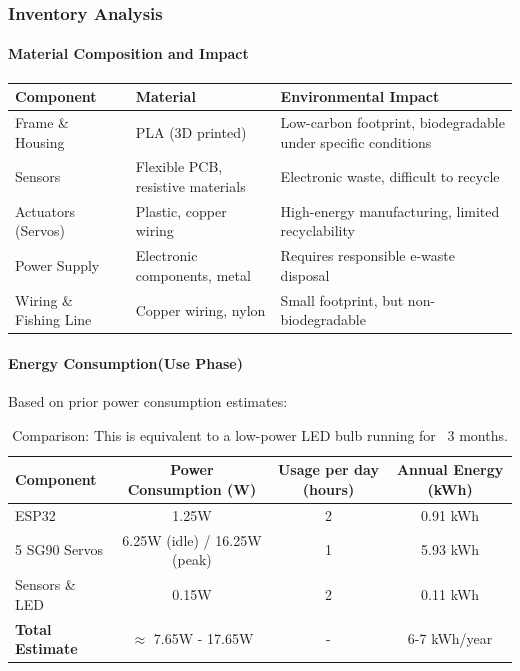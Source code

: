 \documentclass{article}
\begin{document}
\subsubsection{Inventory Analysis}
\paragraph{Material Composition and Impact}
\begin{table}[h]
    \hspace*{-3.5cm}
    \centering
    \begin{tabular}{|l|l|l|}
        \hline
        \textbf{Component} & \textbf{Material} & \textbf{Environmental Impact} \\ 
        \hline
        Frame \& Housing & PLA (3D printed) & Low-carbon footprint, biodegradable under specific conditions \\ 
        \hline
        Sensors & Flexible PCB, resistive materials & Electronic waste, difficult to recycle \\ 
        \hline
        Actuators (Servos) & Plastic, copper wiring & High-energy manufacturing, limited recyclability \\ 
        \hline
        Power Supply & Electronic components, metal & Requires responsible e-waste disposal \\ 
        \hline
        Wiring \& Fishing Line & Copper wiring, nylon & Small footprint, but non-biodegradable \\ 
        \hline
    \end{tabular}
    \label{tab:material_composition}
\end{table}
\paragraph{Energy Consumption(Use Phase)}
Based on prior power consumption estimates:
\begin{table}[h]
    \hspace*{-2.2cm}
    \centering
    \begin{tabular}{|l|c|c|c|}
        \hline
        \textbf{Component} & \textbf{Power Consumption (W)} & \textbf{Usage per day (hours)} & \textbf{Annual Energy (kWh)} \\ 
        \hline
        ESP32 & 1.25W & 2 & 0.91 kWh \\ 
        \hline
        5 SG90 Servos & 6.25W (idle) / 16.25W (peak) & 1 & 5.93 kWh \\ 
        \hline
        Sensors \& LED & 0.15W & 2 & 0.11 kWh \\ 
        \hline
        \textbf{Total Estimate} & $\approx$ 7.65W - 17.65W & - & 6-7 kWh/year \\ 
        \hline
    \end{tabular}
    \caption{Comparison: This is equivalent to a low-power LED bulb running for ~3 months.}
    \label{tab:energy_consumption}
\end{table}
\end{document}
